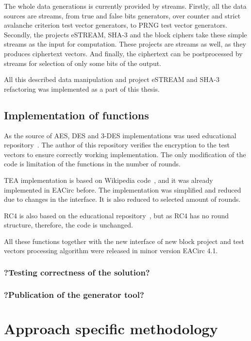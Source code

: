\documentclass[
  print, %
  Table,   %
  nolof,     %
  nolot,     %
  11pt, %
  oneside  %
]{fithesis3}
\begin{document}
The whole data generations is currently provided by streams. Firstly, all the data sources are streams, from true and false bits generators, over counter and strict avalanche criterion test vector generators, to PRNG test vector generators. Secondly, the projects eSTREAM, SHA-3 and the block ciphers take these simple streams as the input for computation. These projects are streams as well, as they produces ciphertext vectors. And finally, the ciphertext can be postprocessed by streams for selection of only some bits of the output.

All this described data manipulation and project eSTREAM and SHA-3 refactoring was implemented as a part of this thesis.

\subsection{Implementation of functions}

As the source of AES, DES and 3-DES implementations was used educational repository~\cite{cryptoFunc}. The author of this repository verifies the encryption to the test vectors to ensure correctly working implementation. The only modification of the code is limitation of the functions in the number of rounds.

TEA implementation is based on Wikipedia code~\cite{teaWiki}, and it was already implemented in EACirc before. The implementation was simplified and reduced due to changes in the interface. It is also reduced to selected amount of rounds.

RC4 is also based on the educational repository~\cite{cryptoFunc}, but as RC4 has no round structure, therefore, the code is unchanged.

All these functions together with the new interface of new block project and test vectors processing algorithm were released in minor version EACirc 4.1.

\subsubsection{?Testing correctness of the solution?}
\subsubsection{?Publication of the generator tool?}


\section{Approach specific methodology}
\end{document}
